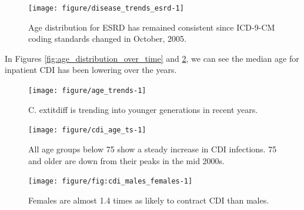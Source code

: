 \documentclass[12pt]{ociamthesis}\usepackage[]{graphicx}\usepackage[]{color}
\newenvironment{knitrout}{}{} %
\begin{document}
\begin{knitrout}
\color{fgcolor}\begin{figure}

{\centering \texttt{[image: figure/disease\_trends\_esrd-1]} 

}

\caption[Age distribution for ESRD has remained consistent since ICD-9-CM coding standards changed in October, 2005]{Age distribution for ESRD has remained consistent since ICD-9-CM coding standards changed in October, 2005.}\label{fig:disease_trends_esrd}
\end{figure}


\end{knitrout}

\label{fig:disease_trends_esrd}

In Figures  \ref{fig:age_distribution_over_time} and \ref{fig:age_trends}, we can see the median age for inpatient CDI has been lowering over the years.


\begin{knitrout}
\color{fgcolor}\begin{figure}

{\centering \texttt{[image: figure/age\_trends-1]} 

}

\caption[C]{C. 	extit{diff} is trending into younger generations in recent years.}\label{fig:age_trends}
\end{figure}


\end{knitrout}
\label{fig:age_distribution_over_time}

\begin{knitrout}
\color{fgcolor}\begin{figure}

{\centering \texttt{[image: figure/cdi\_age\_ts-1]} 

}

\caption[All age groups below 75 show a steady increase in CDI infections]{All age groups below 75 show a steady increase in CDI infections. 75 and older are down from their peaks in the mid 2000s.}\label{fig:cdi_age_ts}
\end{figure}


\end{knitrout}
\label{fig:cdi_age_ts}

\begin{knitrout}
\color{fgcolor}\begin{figure}

{\centering \texttt{[image: figure/fig:cdi\_males\_females-1]} 

}

\caption[Females are almost 1.4 times as likely to contract CDI than males]{Females are almost 1.4 times as likely to contract CDI than males.}\label{fig:fig:cdi_males_females}
\end{figure}


\end{knitrout}
\label{fig:cdi_males_vs_females}
\end{document}
